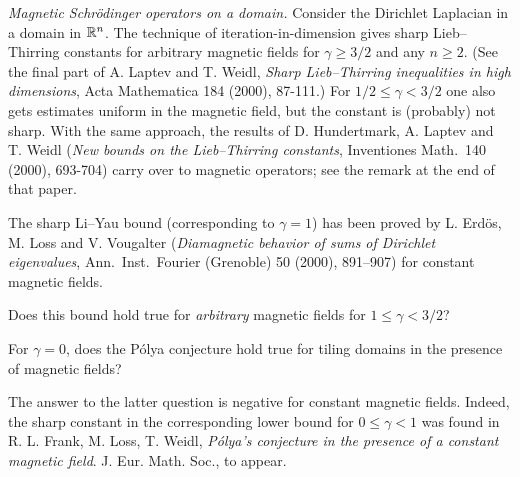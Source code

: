 \documentclass[12pt,letterpaper, reqno]{amsart}
\begin{document}
\begin{problemblock}\emph{Magnetic Schr\"{o}dinger
operators on a domain.} Consider the Dirichlet Laplacian in a domain
in $\mathbb R^n$. The technique of iteration-in-dimension gives sharp
Lieb--Thirring constants for arbitrary magnetic fields for $\gamma
\geq 3/2$ and any $n \geq 2$. (See the final part of A. Laptev and
T. Weidl, \emph{Sharp Lieb--Thirring inequalities in high
dimensions}, Acta Mathematica 184 (2000), 87-111.) For $1/2 \leq
\gamma < 3/2$ one also gets estimates uniform in the magnetic field,
but the constant is (probably) not sharp. With the same approach,
the results of D. Hundertmark, A. Laptev and T. Weidl (\emph{New
bounds on the Lieb--Thirring constants}, Inventiones Math.\ 140
(2000), 693-704) carry over to magnetic operators; see the remark at
the end of that paper.

The sharp Li--Yau bound (corresponding to $\gamma=1$) has been
proved by L. Erd\"{o}s, M. Loss and V. Vougalter (\emph{Diamagnetic
behavior of sums of Dirichlet eigenvalues}, Ann.\ Inst.\ Fourier
(Grenoble) 50 (2000), 891--907) for constant magnetic fields.

\begin{problem}
 \label{it:blymag}
 Does
this bound hold true for \emph{arbitrary} magnetic fields for $1\leq\gamma<3/2$?
\end{problem}
\end{problemblock}

\begin{problemblock}
\begin{problem}
For $\gamma=0$, does the P\'{o}lya conjecture hold true for tiling domains in the
presence of magnetic fields?
\end{problem}


\begin{remark}
 The answer to the latter question is negative for
constant magnetic fields. Indeed, the sharp constant in the corresponding
lower bound for $0\leq\gamma<1$ was found in R. L. Frank, M. Loss,
T. Weidl, \emph{P\'olya's conjecture in the presence of a constant
magnetic field}. J. Eur. Math. Soc., to appear.
\end{remark}

\end{problemblock}
\end{document}
